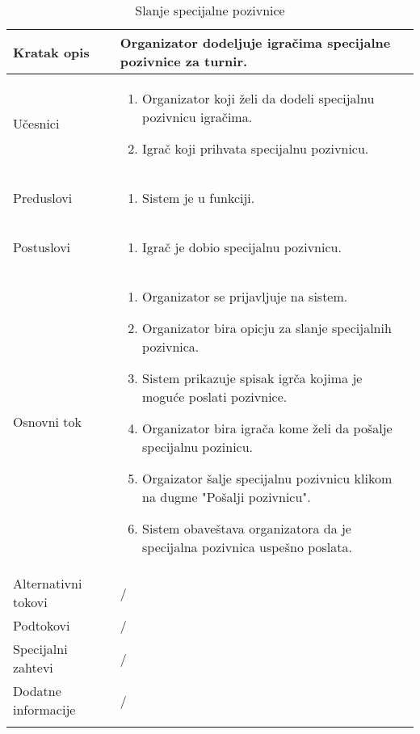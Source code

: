\documentclass{article}
\begin{document}
\begin{longtable}{| p{} | p{} |} 
\hline
    Kratak opis & Organizator dodeljuje igračima specijalne pozivnice za turnir.\\ 
\hline    
    Učesnici & \begin{enumerate}
        \item Organizator koji želi da dodeli specijalnu pozivnicu igračima.
        \item Igrač koji prihvata specijalnu pozivnicu.
    \end{enumerate}
    \\
\hline
   Preduslovi & \begin{enumerate}
       \item Sistem je u funkciji.
   \end{enumerate}\\
\hline  
    Postuslovi & \begin{enumerate}
        \item Igrač je dobio specijalnu pozivnicu.
    \end{enumerate}\\
\hline
    Osnovni tok & \begin{enumerate}
        \item Organizator se prijavljuje na sistem.
        \item Organizator bira opicju za slanje specijalnih pozivnica.
        \item Sistem prikazuje spisak igrča kojima je moguće poslati pozivnice.
        \item Organizator bira igrača kome želi da pošalje specijalnu pozinicu.
        \item Orgaizator šalje specijalnu pozivnicu klikom na dugme "Pošalji pozivnicu".
        \item Sistem obaveštava organizatora da je specijalna pozivnica uspešno poslata.
    \end{enumerate}\\
\hline
    Alternativni tokovi & /\\
\hline
    Podtokovi & /\\
\hline
    Specijalni zahtevi & /\\
\hline
    Dodatne informacije & / \\
\hline
 
\caption{Slanje specijalne pozivnice} 
\end{longtable}
\end{document}
